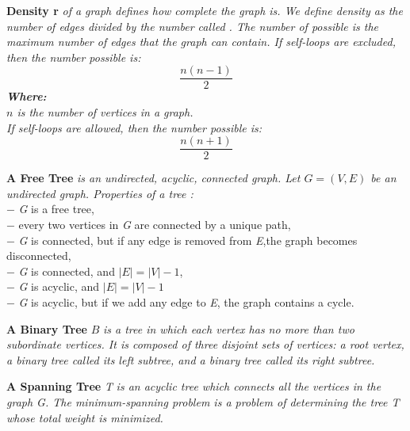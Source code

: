 	\newpage
	\begin{definition} \textbf{Density r} \emph{of a graph defines how complete the graph is. We define density as the number of edges divided by the number called . The number of possible is the maximum number of edges that the graph can contain.
	If self-loops are excluded, then the number possible is:\\
	\begin{equation}\label{acyclic_density}
	\frac{n(n-1)}{2}
	\end{equation}
	\textbf{Where:}\\
	$n$ is the number of vertices in a graph.\\
	\newline
	If self-loops are allowed, then the number possible is:
	\begin{equation}\label{cyclic_density}
	\frac{n(n+1)}{2}
	\end{equation}
	}
	\newline
	\end{definition}
\begin{definition}\textbf{A Free Tree} \emph{ is an undirected, acyclic, connected graph. Let $G = (V,E)$ be an undirected graph. Properties of a tree \cite{6}:}\\
	$-$ \textit{G} is a free tree,\\
	$-$ every two vertices in \textit{G} are connected by a unique path,\\
	$-$ \textit{G} is connected, but if any edge is removed from \textit{E},the graph becomes disconnected,\\
	$-$ \textit{G} is connected, and $|E| = |V| - 1$,\\
	$-$ \textit{G} is acyclic, and $|E| = |V| - 1$\\
	$-$ \textit{G} is acyclic, but if we add any edge to \textit{E}, the graph contains a cycle.\\
\end{definition}
\begin{definition}\textbf{A Binary Tree} $B$ \emph{is a tree in which each vertex has no more than two subordinate vertices. It is composed of three disjoint sets of vertices: a root vertex, a binary tree called its left subtree, and a binary tree called its right subtree.\cite{7}}\end{definition}
\begin{definition}\textbf{A Spanning Tree }\textit{T} \emph{is an acyclic tree which connects all the vertices in the graph \textit{G}. The minimum-spanning problem is a problem of determining the tree \textit{T} whose total weight is minimized.\cite{8}}\end{definition}
